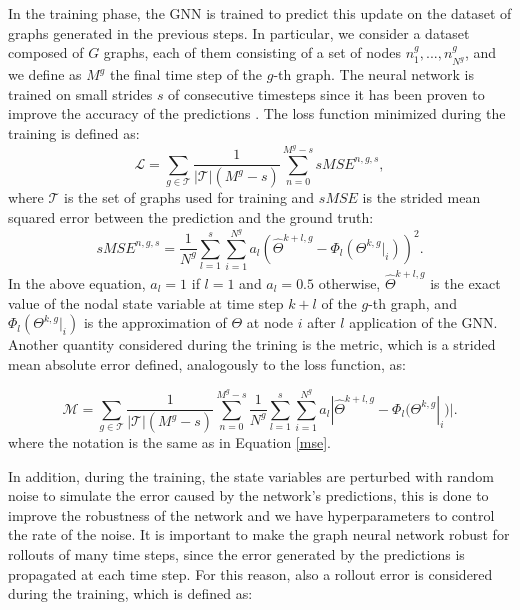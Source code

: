 \documentclass[11pt,a4paper]{article}
\begin{document}
In the training phase, the GNN is trained to predict this update on the dataset of graphs generated in the previous steps. 
In particular, we consider a dataset composed of \(G\) graphs, each of them consisting of a set of nodes \(n_1^g,...,n_{N^g}^g\), and we define as \(M^g\) the final time step of the \(g\)-th graph.
The neural network is trained on small strides \(s\) of consecutive timesteps since it has been proven to improve the accuracy of the predictions \cite{Luca}.
The loss function minimized during the training is defined as:
\begin{equation}
    \mathcal{L} = \sum_{g \in \mathcal{T}} \frac{1}{|\mathcal{T}|(M^g-s)} \sum_{n=0}^{M^g-s} sMSE^{n,g,s},
\end{equation}
where \(\mathcal{T}\) is the set of graphs used for training and \(sMSE\) is the strided mean squared error between the prediction and the ground truth:
\begin{equation}
    sMSE^{n,g,s} = \frac{1}{N^g} \sum_{l=1}^{s} \sum_{i=1}^{N^g} a_l (\hat{\Theta}^{k+l,g} - \Phi_l(\Theta^{k,g}|_i))^2.
    \label{mse}
\end{equation}
In the above equation, \(a_l=1\) if \(l=1\) and \(a_l=0.5\) otherwise, \(\hat{\Theta}^{k+l,g}\) is the exact value of the nodal state variable at time step \(k+l\) of the \(g\)-th graph, and \(\Phi_l(\Theta^{k,g}|_i)\) is the approximation of \(\Theta\) at node \(i\) after \(l\) application of the GNN. 
Another quantity considered during the trining is the metric, which is a strided mean absolute error defined, analogously to the loss function, as:

\begin{equation}
    \mathcal{M} = \sum_{g \in \mathcal{T}} \frac{1}{|\mathcal{T}|(M^g-s)} \sum_{n=0}^{M^g-s} \frac{1}{N^g} \sum_{l=1}^{s} \sum_{i=1}^{N^g} a_l |\hat{\Theta}^{k+l,g} - \Phi_l(\Theta^{k,g}|_i)|.
    \label{metric}
\end{equation}
where the notation is the same as in Equation \eqref{mse}.

In addition, during the training, the state variables are perturbed with random noise to simulate the error caused by the network's predictions, this is done to improve the robustness of the network and we have hyperparameters to control the rate of the noise. 
It is important to make the graph neural network robust for rollouts of many time steps, since the error generated by the predictions is propagated at each time step. 
For this reason, also a rollout error is considered during the training, which is defined as:
\end{document}
